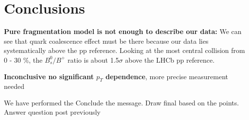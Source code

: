 \section{Conclusions}


\textbf{Pure fragmentation model is not enough to describe our data:} We can see that quark coalescence effect must be there because our data lies systematically above the pp reference. Looking at the most central collision from 0 - 30 \%, the $B^0_s/B^+$ ratio is about 1.5$\sigma$ above the LHCb pp reference. 

\textbf{Inconclusive no significant $p_T$ dependence}, more precise measurement needed 








We have performed the 
Conclude the message. Draw final based on the points. Answer question post previously

